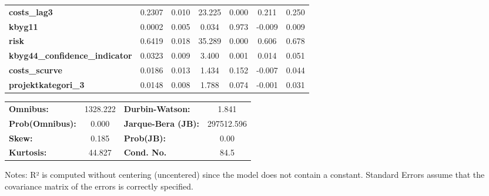 \begin{center}
\begin{tabular}{lcccccc}
\textbf{costs\_lag3}                      &       0.2307  &        0.010     &    23.225  &         0.000        &        0.211    &        0.250     \\
\textbf{kbyg11}                           &       0.0002  &        0.005     &     0.034  &         0.973        &       -0.009    &        0.009     \\
\textbf{risk}                             &       0.6419  &        0.018     &    35.289  &         0.000        &        0.606    &        0.678     \\
\textbf{kbyg44\_confidence\_indicator}    &       0.0323  &        0.009     &     3.400  &         0.001        &        0.014    &        0.051     \\
\textbf{costs\_scurve}                    &       0.0186  &        0.013     &     1.434  &         0.152        &       -0.007    &        0.044     \\
\textbf{projektkategori\_3}               &       0.0148  &        0.008     &     1.788  &         0.074        &       -0.001    &        0.031     \\
\bottomrule
\end{tabular}
\begin{tabular}{lclc}
\textbf{Omnibus:}       & 1328.222 & \textbf{  Durbin-Watson:     } &     1.841   \\
\textbf{Prob(Omnibus):} &   0.000  & \textbf{  Jarque-Bera (JB):  } & 297512.596  \\
\textbf{Skew:}          &   0.185  & \textbf{  Prob(JB):          } &      0.00   \\
\textbf{Kurtosis:}      &  44.827  & \textbf{  Cond. No.          } &      84.5   \\
\bottomrule
\end{tabular}
\end{center}

Notes: \newline
 [1] R² is computed without centering (uncentered) since the model does not contain a constant. \newline
 [2] Standard Errors assume that the covariance matrix of the errors is correctly specified.